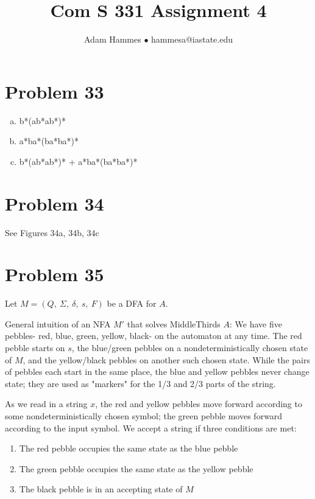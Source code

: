 \documentclass[11pt]{article}
\begin{document}
\title{Com S 331 Assignment 4}
\author{Adam Hammes $\bullet$ hammesa@iastate.edu }
\maketitle

\section*{Problem 33}

\begin{enumerate}[(a)]
	\item b*(ab*ab*)*
	\item a*ba*(ba*ba*)*
	\item b*(ab*ab*)* + a*ba*(ba*ba*)*

\end{enumerate}

\section*{Problem 34}

See Figures 34a, 34b, 34c

\section*{Problem 35}
Let $M = (Q,\ \Sigma,\ \delta,\ s,\ F)$ be a DFA for $A$.

General intuition of an NFA $M'$ that solves MiddleThirds $A$: We have five pebbles- red, blue, green, yellow, black- on the automaton at any time. The red pebble starts on $s$, the blue/green pebbles on a nondeterministically chosen state of $M$, and the yellow/black pebbles on another such chosen state. While the pairs of pebbles each start in the same place, the blue and yellow pebbles never change state; they are used as "markers" for the 1/3 and 2/3 parts of the string.

As we read in a string $x$, the red and yellow pebbles move forward according to some nondeterministically chosen symbol; the green pebble moves forward according to the input symbol. We accept a string if three conditions are met:
\begin{enumerate}
	\item The red pebble occupies the same state as the blue pebble
	\item The green pebble occupies the same state as the yellow pebble
	\item The black pebble is in an accepting state of $M$
\end{enumerate}
\end{document}
